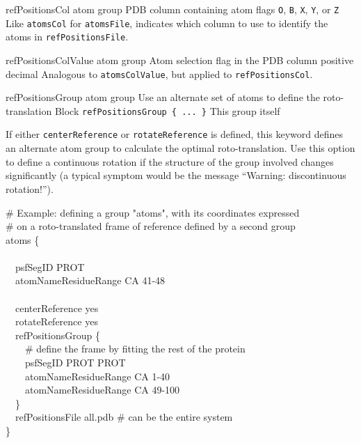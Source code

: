 \begin{itemize}
{\item %
  \key
    {refPositionsCol}{%
    atom group}{%
    PDB column containing atom flags}{%
    \texttt{O}, \texttt{B}, \texttt{X}, \texttt{Y}, or \texttt{Z}}{%
    Like \texttt{atomsCol} for \texttt{atomsFile}, indicates which column to use to identify the atoms in \texttt{refPositionsFile}.}

\item %
  \key
    {refPositionsColValue}{%
    atom group}{%
    Atom selection flag in the PDB column}{%
    positive decimal}{%
    Analogous to \texttt{atomsColValue}, but applied to \texttt{refPositionsCol}.}
}

\item %
  \keydef
    {refPositionsGroup}{%
    atom group}{%
    Use an alternate set of atoms to define the roto-translation}{%
    Block \texttt{refPositionsGroup \{ ... \}}}{%
    This group itself}{%
    If either \texttt{centerReference} or \texttt{rotateReference} is defined, this keyword defines an alternate atom group to calculate the optimal roto-translation.
    Use this option to define a continuous rotation if the structure of the group involved changes significantly (a typical symptom would be the message ``Warning: discontinuous rotation!'').


{%
\noindent\ttfamily
\# Example: defining a group "atoms", with its coordinates expressed \\
\# on a roto-translated frame of reference defined by a second group\\
atoms \{\\
\\
\-~~psfSegID              PROT\\
\-~~atomNameResidueRange  CA 41-48\\
\\
\-~~centerReference yes\\
\-~~rotateReference yes\\
\-~~refPositionsGroup \{\\
\-~~~~\# define the frame by fitting the rest of the protein\\
\-~~~~psfSegID              PROT PROT\\
\-~~~~atomNameResidueRange  CA  1-40\\
\-~~~~atomNameResidueRange  CA 49-100\\
\-~~\} \\
\-~~refPositionsFile all.pdb  \# can be the entire system\\
\}\\}
}
\end{itemize}

